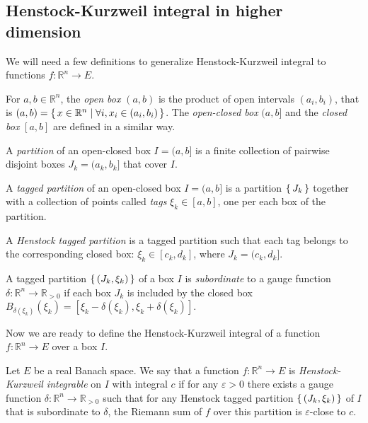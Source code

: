 \documentclass[a4paper,UKenglish,cleveref, autoref, thm-restate]{lipics-v2021}
\newcommand{\bbR}{\mathbb{R}}
\newcommand{\eps}{\varepsilon}
\begin{document}
\subsection{Henstock-Kurzweil integral in higher dimension}%
\label{sec:HK-integral-dim-n}

We will need a few definitions to generalize Henstock-Kurzweil
integral to functions \(f\colon \bbR^{n}\to E\).

\begin{definition}
  For \(a, b \in \bbR^{n}\), the \emph{open box} \((a, b)\) is the
  product of open intervals \((a_{i}, b_{i})\), that is
  \((a, b)=\set{x\in\bbR^{n}|\forall i, x_{i}\in(a_{i}, b_{i})}\). The
  \emph{open-closed box} \((a, b]\) and the \emph{closed box}
  \([a, b]\) are defined in a similar way.

  A \emph{partition} of an open-closed box \(I=(a, b]\) is a finite
  collection of pairwise disjoint boxes \(J_{k}=(a_{k}, b_{k}]\) that
  cover \(I\).

  A \emph{tagged partition} of an open-closed box \(I=(a, b]\) is a partition
  \(\set{J_{k}}\) together with a collection of points called
  \emph{tags} \(\xi_{k}\in [a, b]\), one per each box of the partition.

  A \emph{Henstock tagged partition} is a tagged partition such that
  each tag belongs to the corresponding closed box:
  \(\xi_{k}\in [c_{k}, d_{k}]\), where \(J_{k}=(c_{k}, d_{k}]\).

  A tagged partition \(\set{(J_{k}, \xi_{k})}\) of a box \(I\) is
  \emph{subordinate} to a gauge function
  \(\delta\colon \bbR^{n}\to\bbR_{>0}\) if each box \(J_{k}\) is
  included by the closed box
  \(B_{\delta(\xi_{k})}(\xi_{k})=[\xi_{k}-\delta(\xi_{k}),
  \xi_{k}+\delta(\xi_{k})]\).
\end{definition}

Now we are ready to define the Henstock-Kurzweil integral of a
function \(f\colon \bbR^{n}\to E\) over a box \(I\).
\begin{definition}
  Let \(E\) be a real Banach space. We say that a function
  \(f\colon \bbR^{n}\to E\) is \emph{Henstock-Kurzweil integrable} on
  \(I\) with integral \(c\) if for any \(\eps>0\) there exists a gauge
  function \(\delta\colon \bbR^{n}\to \bbR_{>0}\) such that for any
  Henstock tagged partition \(\set{(J_{k}, \xi_{k})}\) of \(I\) that
  is subordinate to \(\delta\), the Riemann sum of \(f\) over this
  partition is \(\eps\)-close to \(c\).
\end{definition}
\end{document}

